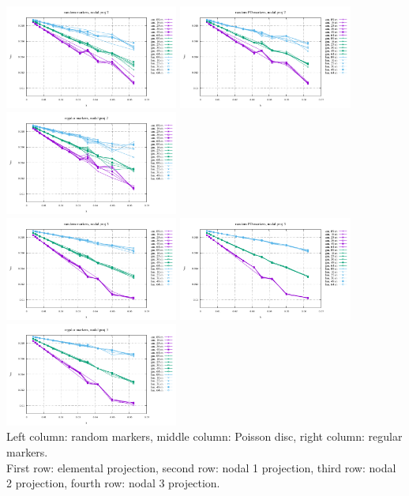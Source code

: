 \begin{center}
\includegraphics[width=5.7cm]{python_codes/fieldstone_13/RESULTS/vrms_rand_proj2} 
\includegraphics[width=5.7cm]{python_codes/fieldstone_13/RESULTS/vrms_poissondisc_proj2} 
\includegraphics[width=5.7cm]{python_codes/fieldstone_13/RESULTS/vrms_reg_proj2}\\ 
\includegraphics[width=5.7cm]{python_codes/fieldstone_13/RESULTS/vrms_rand_proj3} 
\includegraphics[width=5.7cm]{python_codes/fieldstone_13/RESULTS/vrms_poissondisc_proj3} 
\includegraphics[width=5.7cm]{python_codes/fieldstone_13/RESULTS/vrms_reg_proj3}\\
{\captionfont Left column: random markers, middle column: Poisson disc, 
right column: regular markers. \\
First row: elemental projection, second row: nodal 1 projection, 
third row: nodal 2 projection, fourth row: nodal 3 projection. }
\end{center}

